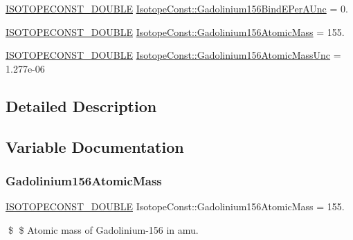 \begin{DoxyCompactItemize}
\mbox{\hyperlink{group___isotope_const-_macros_ga8f45a7272ce02c0b4c65c44636ed719a}{I\+S\+O\+T\+O\+P\+E\+C\+O\+N\+S\+T\+\_\+\+D\+O\+U\+B\+LE}} \mbox{\hyperlink{group___isotope_const-_gadolinium-_gd156_gac11b409d9043b3afb7e53f5e77cc83f7}{Isotope\+Const\+::\+Gadolinium156\+Bind\+E\+Per\+A\+Unc}} = 0.
\item 
\mbox{\hyperlink{group___isotope_const-_macros_ga8f45a7272ce02c0b4c65c44636ed719a}{I\+S\+O\+T\+O\+P\+E\+C\+O\+N\+S\+T\+\_\+\+D\+O\+U\+B\+LE}} \mbox{\hyperlink{group___isotope_const-_gadolinium-_gd156_ga42fe9b3b0a7397f5375623fcb4bc2a62}{Isotope\+Const\+::\+Gadolinium156\+Atomic\+Mass}} = 155.
\item 
\mbox{\hyperlink{group___isotope_const-_macros_ga8f45a7272ce02c0b4c65c44636ed719a}{I\+S\+O\+T\+O\+P\+E\+C\+O\+N\+S\+T\+\_\+\+D\+O\+U\+B\+LE}} \mbox{\hyperlink{group___isotope_const-_gadolinium-_gd156_ga34afbc24aacad1627eae3731f3cedfdb}{Isotope\+Const\+::\+Gadolinium156\+Atomic\+Mass\+Unc}} = 1.\+277e-\/06
\end{DoxyCompactItemize}


\subsection{Detailed Description}


\subsection{Variable Documentation}
\mbox{\label{group___isotope_const-_gadolinium-_gd156_ga42fe9b3b0a7397f5375623fcb4bc2a62}} 
\subsubsection{\texorpdfstring{Gadolinium156\+Atomic\+Mass}{Gadolinium156AtomicMass}}
{\footnotesize\ttfamily \mbox{\hyperlink{group___isotope_const-_macros_ga8f45a7272ce02c0b4c65c44636ed719a}{I\+S\+O\+T\+O\+P\+E\+C\+O\+N\+S\+T\+\_\+\+D\+O\+U\+B\+LE}} Isotope\+Const\+::\+Gadolinium156\+Atomic\+Mass = 155.}

\$ \$ Atomic mass of Gadolinium-\/156 in amu. \mbox{\label{group___isotope_const-_gadolinium-_gd156_ga34afbc24aacad1627eae3731f3cedfdb}} 

